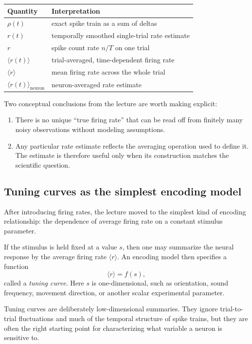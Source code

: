 \documentclass[11pt]{article}
\begin{document}
\begin{center}
\begin{tabular}{ll}
\hline
Quantity & Interpretation \\
\hline
$\rho(t)$ & exact spike train as a sum of deltas \\
$r(t)$ & temporally smoothed single-trial rate estimate \\
$r$ & spike count rate $n/T$ on one trial \\
$\langle r(t) \rangle$ & trial-averaged, time-dependent firing rate \\
$\langle r \rangle$ & mean firing rate across the whole trial \\
$\langle r(t) \rangle_{\mathrm{neuron}}$ & neuron-averaged rate estimate \\
\hline
\end{tabular}
\end{center}

Two conceptual conclusions from the lecture are worth making explicit:
\begin{enumerate}
    \item There is no unique ``true firing rate'' that can be read off from finitely many noisy observations without modeling assumptions.
    \item Any particular rate estimate reflects the averaging operation used to define it. The estimate is therefore useful only when its construction matches the scientific question.
\end{enumerate}

\subsection{Tuning curves as the simplest encoding model}

After introducing firing rates, the lecture moved to the simplest kind of encoding relationship: the dependence of average firing rate on a constant stimulus parameter.

If the stimulus is held fixed at a value $s$, then one may summarize the neural response by the average firing rate $\langle r \rangle$. An encoding model then specifies a function
\[
\langle r \rangle = f(s),
\]
called a \emph{tuning curve}. Here $s$ is one-dimensional, such as orientation, sound frequency, movement direction, or another scalar experimental parameter.

Tuning curves are deliberately low-dimensional summaries. They ignore trial-to-trial fluctuations and much of the temporal structure of spike trains, but they are often the right starting point for characterizing what variable a neuron is sensitive to.
\end{document}
